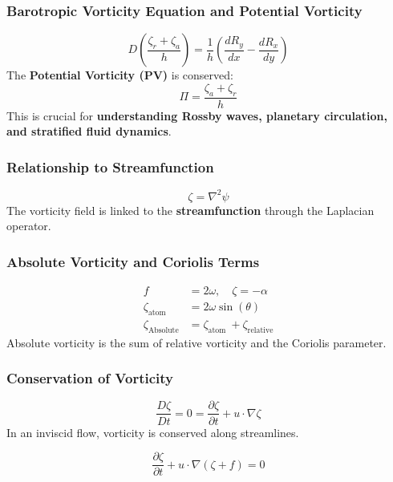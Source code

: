 \documentclass[12pt]{article}
\begin{document}
    \subsubsection*{Barotropic Vorticity Equation and Potential Vorticity}
    \begin{equation}
        D\left(\frac{\zeta_r+\zeta_a}{h}\right)=\frac{1}{h}\left(\frac{d R_y}{d x}-\frac{d R_x}{d y}\right)
    \end{equation}
    The \textbf{Potential Vorticity (PV)} is conserved:
    \begin{equation}
        \Pi = \frac{\zeta_a+\zeta_r}{h}
    \end{equation}
    This is crucial for \textbf{understanding Rossby waves, planetary circulation, and stratified fluid dynamics}.

    \subsubsection*{Relationship to Streamfunction}
    \begin{equation}
        \boxed{\zeta = \nabla^2 \psi}
    \end{equation}
    The vorticity field is linked to the \textbf{streamfunction} through the Laplacian operator.

    \subsubsection{Absolute Vorticity and Coriolis Terms}
    \begin{align}
        f &= 2 \omega, \quad \zeta=-\alpha \\
        \zeta_\text{atom} &= 2 \omega \sin (\theta) \\
        \zeta_\text{Absolute} &= \zeta_\text{atom }+\zeta_\text{relative}
    \end{align}
    Absolute vorticity is the sum of relative vorticity and the Coriolis parameter.

    \subsubsection{Conservation of Vorticity}
    \begin{equation*}
        \frac{D \zeta}{D t}=0=\frac{\partial \zeta}{\partial t}+u \cdot \nabla \zeta
    \end{equation*}
    In an inviscid flow, vorticity is conserved along streamlines.

    \begin{equation}
        \frac{\partial \zeta}{\partial t} + u \cdot \nabla(\zeta + f)=0
    \end{equation}
\end{document}
